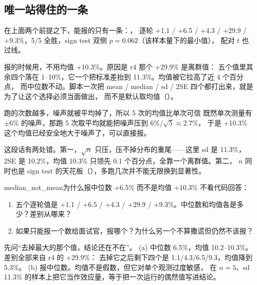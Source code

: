 \subsection{唯一站得住的一条}
\label{subsec:the-one-claim}

在上面两个前提之下，能报的只有一条：，
逐轮 +1.1 / +6.5 / +4.3 / +29.9 / +9.3\%，5/5 全胜，sign test 双侧 $p=0.062$（该样本量下的最小值），
配对 $t$ 也过线。

报的时候用，不用均值 +10.3\%。原因是 r4 那个 +29.9\% 是离群值：
五个值里其余四个落在 1--10\%，它一个把标准差抬到 11.3\%。均值被它拉高了近 4 个百分点，
而中位数不动。脚本一次把 mean / median / sd / 2SE 四个都打出来，就是为了让这个选择必须当面做出，
而不是默认取均值（）。

\begin{misconception}{跑的次数越多，噪声就被平均掉了，所以 5 次的均值比单次可信}
既然单次测量有 $\pm$6\% 的噪声，那跑 5 次取平均就能把噪声压到 $6\%/\sqrt{5} \approx 2.7\%$，
于是 +10.3\% 这个均值已经安全地大于噪声了，可以直接报。
\end{misconception}

这段话有两处错。第一，$\sqrt{n}$ 只压，压不掉分布的重尾——这里 sd 是 11.3\%，
2SE 是 10.2\%，均值 10.3\% 只领先 0.1 个百分点，全靠一个离群值。第二，
$n$ 同时也是 sign test 的天花板（），多跑几次并不能无限换到显著性。

\begin{checkpoint}{median_not_mean}{为什么报中位数 +6.5\% 而不是均值 +10.3\%}
不看代码回答：
\begin{enumerate}[label=(\alph*)]
  \item 五个逐轮值是 +1.1 / +6.5 / +4.3 / +29.9 / +9.3\%。中位数和均值各是多少？差别从哪来？
  \item 如果只能报一个数给面试官，报哪个？为什么另一个不算撒谎但仍然不该报？
\end{enumerate}
\hint 先问“去掉最大的那个值，结论还在不在”。
\ifshowanswers
\tcblower
\answer (a) 中位数 6.5\%，均值 10.2--10.3\%。差别全部来自 r4 的 +29.9\%：
去掉它之后剩下四个是 1.1/4.3/6.5/9.3，均值降到 5.3\%。
(b) 报中位数。均值不是假数，但它对单个观测过度敏感，
在 $n=5$、sd 11.3\% 的样本上把它当作效应量，等于把一次运行的偶然值写进结论。
\whereincode {}
\fi
\end{checkpoint}

